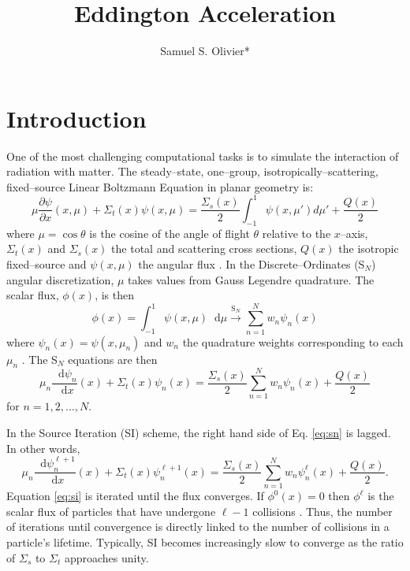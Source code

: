 \documentclass{anstrans}
\title{Eddington Acceleration}
\author{Samuel S. Olivier*}
\institute{Department of Nuclear Engineering, Texas A\&M University, College Station, TX 77843}
\newcommand{\SN}{S$_N$\xspace}
\newcommand{\ud}{\mathop{}\!\mathrm{d}} %
\newcommand{\pderiv}[2]{\frac{\partial #1}{\partial #2}}
\newcommand{\dderiv}[2]{\frac{\ud #1}{\ud #2}}
\begin{document}
\section{Introduction}
	One of the most challenging computational tasks is to simulate the interaction of radiation with matter. The steady--state, one--group, isotropically--scattering, fixed--source Linear Boltzmann Equation in planar geometry is: 
		\begin{equation} \label{eq:bte}
			\mu \pderiv{\psi}{x}(x, \mu) + \Sigma_t(x) \psi(x,\mu) = 
			\frac{\Sigma_s(x)}{2} \int_{-1}^{1} \psi(x, \mu') d\mu' + \frac{Q(x)}{2}
		\end{equation}
	where $\mu = \cos\theta$ is the cosine of the angle of flight $\theta$ relative to the $x$--axis, $\Sigma_t(x)$ and $\Sigma_s(x)$ the total and scattering cross sections, $Q(x)$ the isotropic fixed--source and $\psi(x, \mu)$ the angular flux \cite{adams}. In the Discrete--Ordinates (\SN) angular discretization, $\mu$ takes values from Gauss Legendre quadrature. The scalar flux, $\phi(x)$, is then 
		\begin{equation} \label{eq:quad}
			\phi(x) = \int_{-1}^1 \psi(x, \mu) \ud\mu 
				\xrightarrow{\text{S}_N} \sum_{n=1}^N w_n \psi_n(x)
		\end{equation}
	where $\psi_n(x) = \psi(x,\mu_n)$ and $w_n$ the quadrature weights corresponding to each $\mu_n$ \cite{llnl}. The \SN equations are then 
		\begin{equation} \label{eq:sn}
			\mu_n \dderiv{\psi_n}{x}(x) + \Sigma_t(x) \psi_n(x) = 
			\frac{\Sigma_s(x)}{2} \sum_{n=1}^N w_n \psi_n(x) + \frac{Q(x)}{2} 
		\end{equation}
	for $n = 1, 2, \dots, N$. 

	In the Source Iteration (SI) scheme, the right hand side of Eq. \ref{eq:sn} is lagged. In other words, 
		\begin{equation} \label{eq:si}
			\mu_n \dderiv{\psi_n^{\ell+1}}{x}(x) + \Sigma_t(x) \psi_n^{\ell+1}(x) = 
			\frac{\Sigma_s(x)}{2} \sum_{n=1}^N w_n \psi_n^\ell(x) + \frac{Q(x)}{2}. 
		\end{equation}
	Equation \ref{eq:si} is iterated until the flux converges. If $\phi^0(x) = 0$ then $\phi^\ell$ is the scalar flux of particles that have undergone $\ell - 1$ collisions \cite{adams}. Thus, the number of iterations until convergence is directly linked to the number of collisions in a particle's lifetime. Typically, SI becomes increasingly slow to converge as the ratio of $\Sigma_s$ to $\Sigma_t$ approaches unity. 
\end{document}
